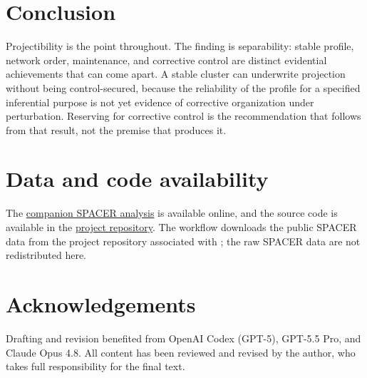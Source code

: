 \documentclass[12pt]{article}
\newif\ifsubmissionanonymous
\begin{document}
\section{Conclusion}

Projectibility is the point throughout. The finding is separability: stable
profile, network order, maintenance, and corrective control are distinct
evidential achievements that can come apart. A stable cluster can
underwrite projection without being control-secured, because the reliability of
the profile for a specified inferential purpose is not yet evidence of corrective
organization under perturbation. Reserving  for corrective
control is the recommendation that follows from that result, not the premise that
produces it.

\section*{Data and code availability}

\ifsubmissionanonymous
Links to the companion analysis and source repository are omitted for anonymous
review and will be restored after peer review.
\else
The \href{https://brettrey.github.io/not-every-stable-cluster-is-homeostatic/}{companion
SPACER analysis} is available online, and the source code is available in the
\href{https://github.com/BrettRey/not-every-stable-cluster-is-homeostatic/tree/main/analysis/spacer-diagnostic}{project
repository}. The workflow downloads the public SPACER data from the project
repository associated with \textcite{upadhyeEtAl2025spacer}; the raw SPACER data
are not redistributed here.

\section*{Acknowledgements}

Drafting and revision benefited from OpenAI Codex (GPT-5), GPT-5.5 Pro, and Claude
Opus 4.8. All content has been reviewed and revised by the author, who takes full
responsibility for the final text.
\fi

\clearpage

\printbibliography
\end{document}
